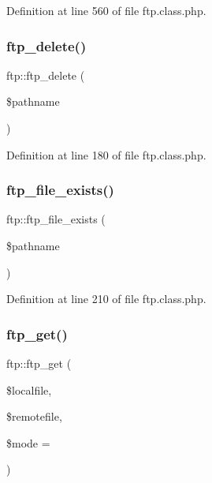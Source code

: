 Definition at line 560 of file ftp.\+class.\+php.

\hypertarget{classftp_a1eb0184819c272bedac4d8645a36e02a}{}\label{classftp_a1eb0184819c272bedac4d8645a36e02a} 
\subsubsection{\texorpdfstring{ftp\+\_\+delete()}{ftp\_delete()}}
{\footnotesize\ttfamily ftp\+::ftp\+\_\+delete (\begin{DoxyParamCaption}\item[{}]{\$pathname }\end{DoxyParamCaption})}



Definition at line 180 of file ftp.\+class.\+php.

\hypertarget{classftp_ab1fd207d406a6d97ab82b420cd149143}{}\label{classftp_ab1fd207d406a6d97ab82b420cd149143} 
\subsubsection{\texorpdfstring{ftp\+\_\+file\+\_\+exists()}{ftp\_file\_exists()}}
{\footnotesize\ttfamily ftp\+::ftp\+\_\+file\+\_\+exists (\begin{DoxyParamCaption}\item[{}]{\$pathname }\end{DoxyParamCaption})}



Definition at line 210 of file ftp.\+class.\+php.

\hypertarget{classftp_a1d7ba9f87f7c5d628876ffe7baf36705}{}\label{classftp_a1d7ba9f87f7c5d628876ffe7baf36705} 
\subsubsection{\texorpdfstring{ftp\+\_\+get()}{ftp\_get()}}
{\footnotesize\ttfamily ftp\+::ftp\+\_\+get (\begin{DoxyParamCaption}\item[{}]{\$localfile,  }\item[{}]{\$remotefile,  }\item[{}]{\$mode = {} }\end{DoxyParamCaption})}



